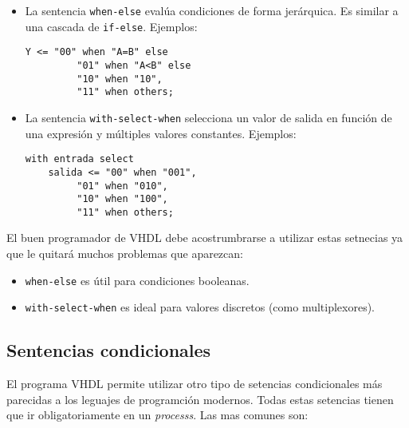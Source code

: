 \begin{itemize}
    \item 
La sentencia \texttt{when-else} evalúa condiciones de forma jerárquica. Es similar a una cascada de \texttt{if-else}. Ejemplos: 


\begin{lstlisting}[caption={Ejemplo de \texttt{when-else}}]
    Y <= "00" when "A=B" else
         "01" when "A<B" else
         "10" when "10",
         "11" when others;
\end{lstlisting}

    \item 
La sentencia \texttt{with-select-when} selecciona un valor de salida en función de una expresión y múltiples valores constantes. Ejemplos: 

\begin{lstlisting}[caption={Ejemplo de \texttt{with-select-when}}]
with entrada select
    salida <= "00" when "001",
         "01" when "010",
         "10" when "100",
         "11" when others;
\end{lstlisting}


\end{itemize}
El buen programador de VHDL debe acostrumbrarse a utilizar estas setnecias ya que le quitará muchos problemas que aparezcan: 
\begin{itemize}
    \item \texttt{when-else} es útil para condiciones booleanas.
    \item \texttt{with-select-when} es ideal para valores discretos (como multiplexores).
\end{itemize}

\subsection{Sentencias condicionales}
El programa VHDL permite utilizar otro tipo de setencias condicionales más parecidas a los leguajes de programción modernos. Todas estas setencias tienen que ir obligatoriamente en un \textit{processs}. Las mas comunes son:  

